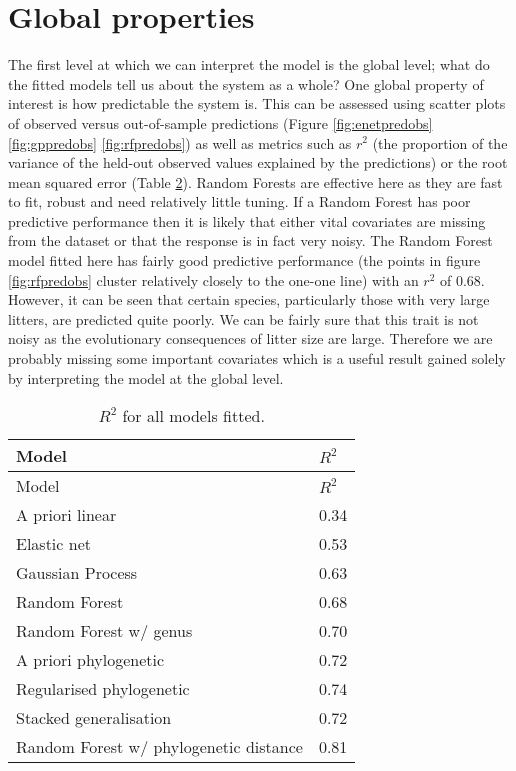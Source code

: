 \documentclass[12pt,]{article}
\begin{document}
\section{Global properties}\label{global-properties}

The first level at which we can interpret the model is the global level; what do the fitted models tell us about the system as a whole?
One global property of interest is how predictable the system is.
This can be assessed using scatter plots of observed versus out-of-sample predictions (Figure \ref{fig:enetpredobs} \ref{fig:gppredobs} \ref{fig:rfpredobs}) as well as metrics such as  \(r^2\) (the proportion of the variance of the held-out observed values explained by the predictions) or the root mean squared error (Table \ref{tbl:allr2}).
Random Forests are effective here as they are fast to fit, robust and need relatively little tuning.
If a Random Forest has poor predictive performance then it is likely that either vital covariates are missing from the dataset or that the response is in fact very noisy.
The Random Forest model fitted here has fairly good predictive performance (the points in figure \ref{fig:rfpredobs} cluster relatively closely to the one-one line) with an \(r^2\) of 0.68.
However, it can be seen that certain species, particularly those with very large litters, are predicted quite poorly.
We can be fairly sure that this trait is not noisy as the evolutionary consequences of litter size are large.
Therefore we are probably missing some important covariates which is a useful result gained solely by interpreting the model at the global level.

\begin{table}[t!]
\begin{longtable}[c]{@{}ll@{}}
\caption{\(R^2\) for all models fitted. \label{tbl:allr2}}\tabularnewline
\toprule
Model & \(R^2\)\tabularnewline
\midrule
\endfirsthead
\toprule
Model & \(R^2\)\tabularnewline
\midrule
\endhead
A priori linear & 0.34\tabularnewline
Elastic net & 0.53\tabularnewline
Gaussian Process & 0.63\tabularnewline
Random Forest & 0.68\tabularnewline
Random Forest w/ genus & 0.70\tabularnewline
A priori phylogenetic & 0.72\tabularnewline
Regularised phylogenetic & 0.74\tabularnewline
Stacked generalisation & 0.72\tabularnewline
Random Forest w/ phylogenetic distance & 0.81\tabularnewline
\bottomrule
\end{longtable}
\end{table}
\end{document}
